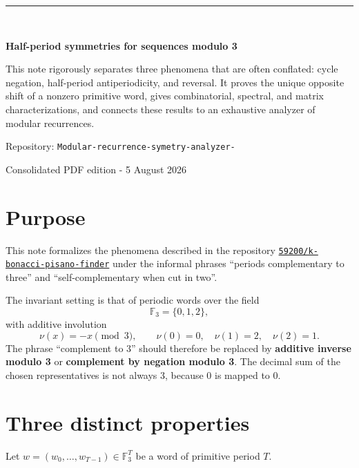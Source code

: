 \documentclass[11pt,a4paper]{article}
\newcommand{\F}{\mathbb F}\newcommand{\Z}{\mathbb Z}\newcommand{\concat}{\mathbin{\Vert}}
\begin{document}
\begin{titlepage}\thispagestyle{empty}\vspace*{22mm}
{\color{accent}\rule{\textwidth}{1.2pt}}\\[15mm]
{\fontsize{27}{33}\selectfont\bfseries\color{ink}Half-period symmetries for sequences modulo 3\par}
\vspace{13mm}
\begin{summarybox}This note rigorously separates three phenomena that are often conflated: cycle negation, half-period antiperiodicity, and reversal. It proves the unique opposite shift of a nonzero primitive word, gives combinatorial, spectral, and matrix characterizations, and connects these results to an exhaustive analyzer of modular recurrences.\end{summarybox}
\vfill{\large\color{muted}Repository: \texttt{Modular-recurrence-symetry-analyzer-}\par}
{\large\color{muted}Consolidated PDF edition - 5 August 2026\par}\vspace{12mm}{\color{accent}\rule{\textwidth}{1.2pt}}\end{titlepage}
\renewcommand{\contentsname}{Contents}\tableofcontents\clearpage
\section{Purpose}
This note formalizes the phenomena described in the repository \href{https://github.com/59200/k-bonacci-pisano-finder}{\texttt{59200/k-bonacci-pisano-finder}} under the informal phrases ``periods complementary to three'' and ``self-complementary when cut in two''.

The invariant setting is that of periodic words over the field \[\F_3=\{0,1,2\},\] with additive involution \[\nu(x)=-x\pmod 3,\qquad \nu(0)=0,\quad \nu(1)=2,\quad \nu(2)=1.\] The phrase ``complement to 3'' should therefore be replaced by \textbf{additive inverse modulo 3} or \textbf{complement by negation modulo 3}. The decimal sum of the chosen representatives is not always 3, because 0 is mapped to 0.
\section{Three distinct properties}
Let \(w=(w_0,\ldots,w_{T-1})\in\F_3^T\) be a word of primitive period \(T\).
\end{document}
